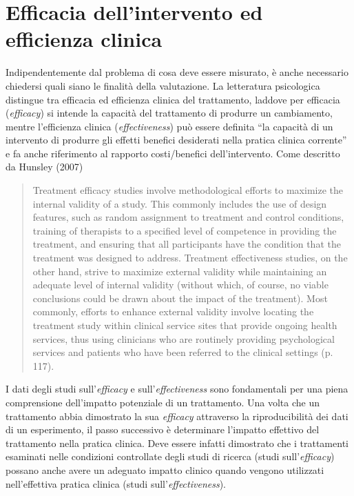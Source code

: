 \section{Efficacia dell'intervento ed efficienza clinica}

Indipendentemente dal problema di cosa deve essere misurato, è anche necessario chiedersi quali siano le finalità della valutazione.
La letteratura psicologica distingue tra efficacia ed efficienza clinica del trattamento, laddove per efficacia (\emph{efficacy}) si intende la capacità del trattamento di produrre un cambiamento, mentre l'efficienza clinica (\emph{effectiveness}) può essere definita ``la capacità di un intervento di produrre gli effetti benefici desiderati nella pratica clinica corrente'' e fa anche riferimento al rapporto costi/benefici dell'intervento.
Come descritto da Hunsley (2007)
\begin{quote}
Treatment efficacy studies involve methodological efforts to maximize the internal validity of a study. 
This commonly includes the use of design features, such as random assignment to treatment and control conditions, training of therapists to a specified level of competence in providing the treatment, and ensuring that all participants have the condition that the treatment was designed to address. 
Treatment effectiveness studies, on the other hand, strive to maximize external validity while maintaining an adequate level of internal validity (without which, of course, no viable conclusions could be drawn about the impact of the treatment). 
Most commonly, efforts to enhance external validity involve locating the treatment study within clinical service sites that provide ongoing health services, thus using clinicians who are routinely providing psychological services and patients who have been referred to the clinical settings (p. 117).
\end{quote}

I dati degli studi sull'\emph{efficacy} e sull'\emph{effectiveness} sono fondamentali per una piena comprensione dell'impatto potenziale di un trattamento. 
Una volta che un trattamento abbia dimostrato la sua \emph{efficacy} attraverso la riproducibilità dei dati di un esperimento, il passo successivo è determinare l'impatto effettivo del trattamento nella pratica clinica.
Deve essere infatti dimostrato che i trattamenti esaminati nelle condizioni controllate degli studi di ricerca (studi sull'\emph{efficacy}) possano anche avere un adeguato impatto clinico quando vengono utilizzati nell'effettiva pratica clinica (studi sull'\emph{effectiveness}). 

